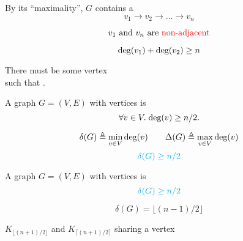 \begin{frame}{}
  \begin{center}
    By its ``maximality'', $G$ contains a  \\[3pt]
    \[
      v_{1} \to v_{2} \to \dots \to v_{n}
    \]

    \pause
    \vspace{-0.60cm}
    \[
      v_{1} \text{ and } v_{n} \text{ are \textcolor{red}{non-adjacent}}
    \]

    \pause
    \vspace{-0.60cm}
    \[
      \text{deg}(v_{1}) + \text{deg}(v_{2}) \ge n
    \]

    \pause
    There must be some vertex  \\[3pt]
    such that .
  \end{center}
\end{frame}

\begin{frame}{}
  \begin{theorem}
    A  graph $G = (V, E)$
    with  vertices is 
    \[
      \forall v \in V.\; \text{deg}(v) \ge n/2.
    \]
  \end{theorem}

  \pause
  \[
    \delta(G) \triangleq \min_{v \in V} \text{deg}(v)
    \qquad
    \Delta(G) \triangleq \max_{v \in V} \text{deg}(v)
  \]
  \[
    \textcolor{cyan}{\delta(G) \ge n/2}
  \]

  \pause
\end{frame}

\begin{frame}{}
  \begin{theorem}
    A  graph $G = (V, E)$
    with  vertices is 
    \[
      \textcolor{cyan}{\delta(G) \ge n/2}
    \]
  \end{theorem}

  \pause
  \[
    \delta(G) = \lfloor (n-1)/2 \rfloor
  \]

  \pause
  \vspace{0.30cm}
  \begin{center}
    $K_{\lfloor (n + 1)/ 2 \rfloor}$ and $K_{\lceil (n+1)/2 \rceil}$
    sharing a vertex
  \end{center}
\end{frame}
